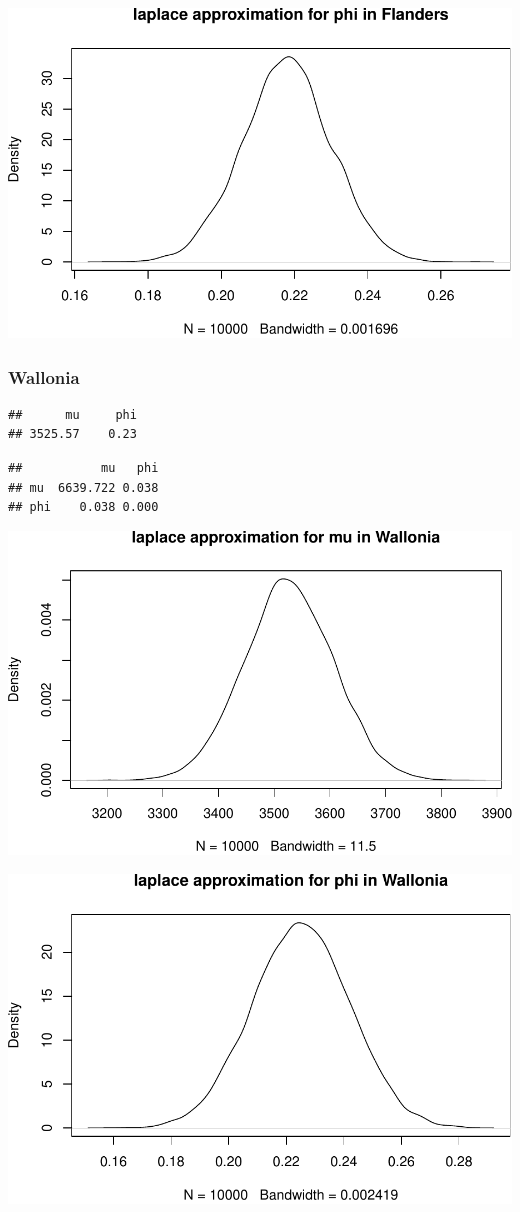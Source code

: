 \documentclass[a4paper, 12pt]{article}
\begin{document}
    \begin{center}\includegraphics[width=0.8\linewidth]{resources/figs/unnamed-chunk-7-2} \end{center}

    \hypertarget{wallonia}{%
    \subsubsection{Wallonia}\label{wallonia}}

\begin{verbatim}
##      mu     phi 
## 3525.57    0.23
\end{verbatim}

\begin{verbatim}
##           mu   phi
## mu  6639.722 0.038
## phi    0.038 0.000
\end{verbatim}

    \begin{center}\includegraphics[width=0.8\linewidth]{resources/figs/unnamed-chunk-9-1} \end{center}

    \begin{center}\includegraphics[width=0.8\linewidth]{resources/figs/unnamed-chunk-9-2} \end{center}
\end{document}
